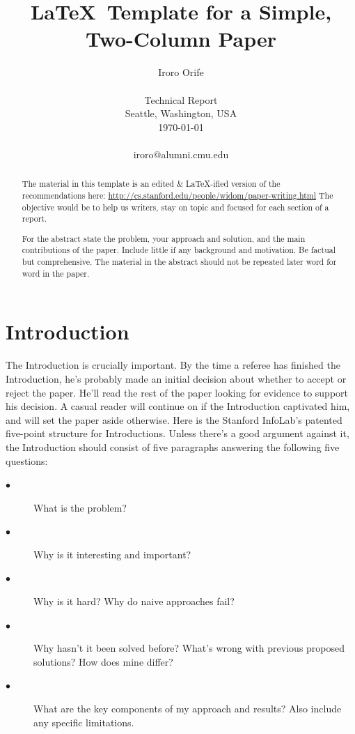 \documentclass[10pt,twocolumn]{article}
\begin{document}
\title{\LaTeX\ Template for a Simple, Two-Column Paper}

\author{Iroro Orife \\
\\
Technical Report \\
Seattle, Washington, USA \\
\today
\\
\\
iroro@alumni.cmu.edu  \\
}


\maketitle
\thispagestyle{empty}

\begin{abstract}
The material in this template is an edited \& \LaTeX\--ified version of the recommendations here: \url{http://cs.stanford.edu/people/widom/paper-writing.html} The objective would be to help us writers, stay on topic and focused for each section of a report.

For the abstract state the problem, your approach and solution, and the main contributions of the paper. Include little if any background and motivation. Be factual but comprehensive. The material in the abstract should not be repeated later word for word in the paper. 
\end{abstract}


\section{Introduction}
The Introduction is crucially important. By the time a referee has finished the Introduction, he's probably made an initial decision about whether to accept or reject the paper. He'll read the rest of the paper looking for evidence to support his decision. A casual reader will continue on if the Introduction captivated him, and will set the paper aside otherwise. 
Here is the Stanford InfoLab's patented five-point structure for Introductions. Unless there's a good argument against it, the Introduction should consist of five paragraphs answering the following five questions:

\begin{description}
  \item[$\bullet$]  What is the problem?
  \item[$\bullet$]  Why is it interesting and important?
  \item[$\bullet$]  Why is it hard? Why do naive approaches fail?
  \item[$\bullet$]  Why hasn't it been solved before? What's wrong with previous proposed solutions? How does mine differ?
  \item[$\bullet$]  What are the key components of my approach and results? Also include any specific limitations.
\end{description}
  
\end{document}
